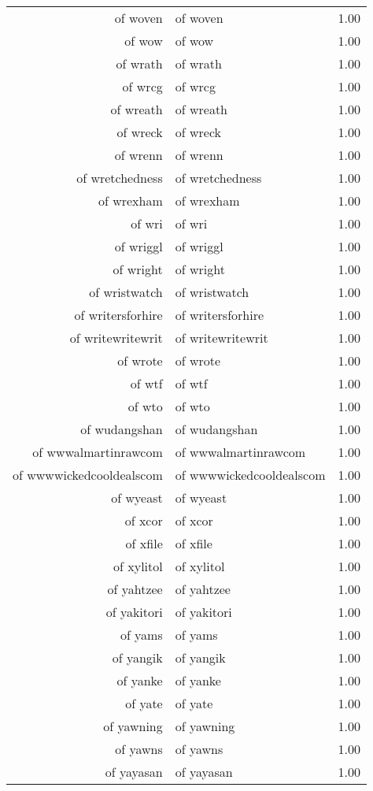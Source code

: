 \begin{table}[ht]
\begin{tabular}{rlr}
  of woven & of woven & 1.00 \\ 
  of wow & of wow & 1.00 \\ 
  of wrath & of wrath & 1.00 \\ 
  of wrcg & of wrcg & 1.00 \\ 
  of wreath & of wreath & 1.00 \\ 
  of wreck & of wreck & 1.00 \\ 
  of wrenn & of wrenn & 1.00 \\ 
  of wretchedness & of wretchedness & 1.00 \\ 
  of wrexham & of wrexham & 1.00 \\ 
  of wri & of wri & 1.00 \\ 
  of wriggl & of wriggl & 1.00 \\ 
  of wright & of wright & 1.00 \\ 
  of wristwatch & of wristwatch & 1.00 \\ 
  of writersforhire & of writersforhire & 1.00 \\ 
  of writewritewrit & of writewritewrit & 1.00 \\ 
  of wrote & of wrote & 1.00 \\ 
  of wtf & of wtf & 1.00 \\ 
  of wto & of wto & 1.00 \\ 
  of wudangshan & of wudangshan & 1.00 \\ 
  of wwwalmartinrawcom & of wwwalmartinrawcom & 1.00 \\ 
  of wwwwickedcooldealscom & of wwwwickedcooldealscom & 1.00 \\ 
  of wyeast & of wyeast & 1.00 \\ 
  of xcor & of xcor & 1.00 \\ 
  of xfile & of xfile & 1.00 \\ 
  of xylitol & of xylitol & 1.00 \\ 
  of yahtzee & of yahtzee & 1.00 \\ 
  of yakitori & of yakitori & 1.00 \\ 
  of yams & of yams & 1.00 \\ 
  of yangik & of yangik & 1.00 \\ 
  of yanke & of yanke & 1.00 \\ 
  of yate & of yate & 1.00 \\ 
  of yawning & of yawning & 1.00 \\ 
  of yawns & of yawns & 1.00 \\ 
  of yayasan & of yayasan & 1.00 \\ 

\end{tabular}
\end{table}
